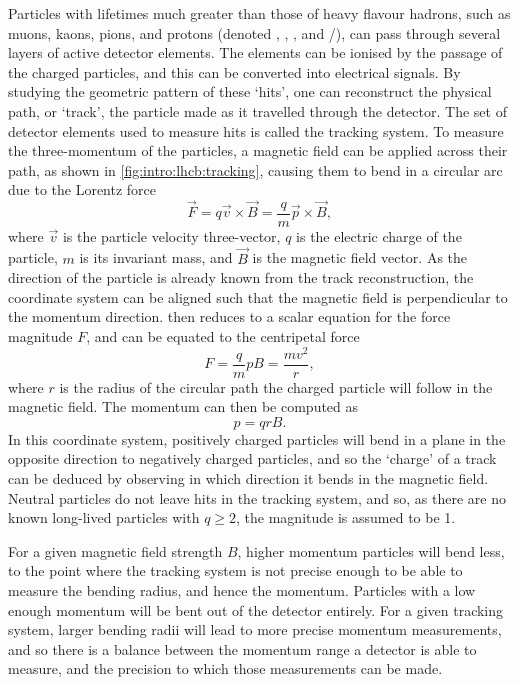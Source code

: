 Particles with lifetimes much greater than those of heavy flavour hadrons, such 
as muons, kaons, pions, and protons (denoted \Pmupm, \PKpm, \Ppipm, and 
\Pproton/\APproton), can pass through several layers of active detector 
elements.
The elements can be ionised by the passage of the charged particles, and this 
can be converted into electrical signals.
By studying the geometric pattern of these `hits', one can reconstruct the 
physical path, or `track', the particle made as it travelled through the 
detector.
The set of detector elements used to measure hits is called the tracking 
system.
To measure the three-momentum of the particles, a magnetic field can be applied 
across their path, as shown in \cref{fig:intro:lhcb:tracking}, causing them to 
bend in a circular arc due to the Lorentz force
\begin{equation}
  \vec{F} = q\vec{v}\times\vec{B}
          = \frac{q}{m}\vec{p}\times\vec{B},
  \label{eqn:intro:lhcb:lorentz_force}
\end{equation}
where $\vec{v}$ is the particle velocity three-vector, $q$ is the electric 
charge of the particle, $m$ is its invariant mass, and $\vec{B}$ is the 
magnetic field vector.
As the direction of the particle is already known from the track 
reconstruction, the coordinate system can be aligned such that the magnetic 
field is perpendicular to the momentum direction.
 then reduces to a scalar equation for the 
force magnitude $F$, and can be equated to the centripetal force
\begin{equation}
  F = \frac{q}{m}pB = \frac{mv^{2}}{r},
  \label{eqn:intro:lhcb:lorentz_centripetal}
\end{equation}
where $r$ is the radius of the circular path the charged particle will follow 
in the magnetic field.
The momentum can then be computed as
\begin{equation}
  p = qrB.
  \label{eqn:intro:lhcb:momentum_from_magnet}
\end{equation}
In this coordinate system, positively charged particles will bend in a plane in 
the opposite direction to negatively charged particles, and so the `charge' of 
a track can be deduced by observing in which direction it bends in the magnetic 
field.
Neutral particles do not leave hits in the tracking system, and so, as there 
are no known long-lived particles with $q \geq 2$, the magnitude is assumed to 
be 1.

For a given magnetic field strength $B$, higher momentum particles will bend 
less, to the point where the tracking system is not precise enough to be able 
to measure the bending radius, and hence the momentum.
Particles with a low enough momentum will be bent out of the detector entirely.
For a given tracking system, larger bending radii will lead to more precise 
momentum measurements, and so there is a balance between the momentum range a 
detector is able to measure, and the precision to which those measurements can 
be made.

